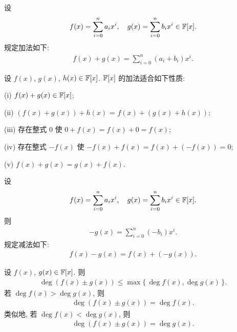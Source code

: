 \begin{definition}
    设
    \begin{align*}
        f(x) = \sum_{i=0}^n a_i x^i, \quad g(x) = \sum_{i=0}^n b_i x^i \in \mathbb{F}[x].
    \end{align*}
    规定加法如下:
    \begin{align*}
        f(x) + g(x) = \sum_{i=0}^n (a_i + b_i) x^i.
    \end{align*}
\end{definition}

\begin{proposition}
    设 $f(x)$, $g(x)$, $h(x) \in \mathbb{F}[x]$. $\mathbb{F}[x]$ 的加法适合如下性质:

    (i) $f(x) + g(x) \in \mathbb{F}[x]$;

    (ii) $(f(x) + g(x)) + h(x)$ = $f(x) + (g(x) + h(x))$;

    (iii) 存在整式 $0$ 使 $0 + f(x) = f(x) + 0 = f(x)$;

    (iv) 存在整式 $-f(x)$ 使 $-f(x) + f(x) = f(x) + (-f(x)) = 0$;

    (v) $f(x) + g(x) = g(x) + f(x)$.
\end{proposition}

\begin{definition}
    设
    \begin{align*}
        f(x) = \sum_{i=0}^n a_i x^i, \quad g(x) = \sum_{i=0}^n b_i x^i \in \mathbb{F}[x].
    \end{align*}
    则
    \begin{align*}
        -g(x) = \sum_{i=0}^n (-b_i) x^i.
    \end{align*}
    规定减法如下:
    \begin{align*}
        f(x) - g(x) = f(x) + (-g(x)).
    \end{align*}
\end{definition}

\begin{proposition}
    设 $f(x)$, $g(x) \in \mathbb{F}[x]$. 则
    \begin{align*}
        \deg (f(x) \pm g(x)) \leq \max \{\, \deg f(x), \deg g(x) \,\}.
    \end{align*}
    若 $\deg f(x) > \deg g(x)$, 则
    \begin{align*}
        \deg (f(x) \pm g(x)) = \deg f(x).
    \end{align*}
    类似地, 若 $\deg f(x) < \deg g(x)$, 则
    \begin{align*}
        \deg (f(x) \pm g(x)) = \deg g(x).
    \end{align*}
\end{proposition}


